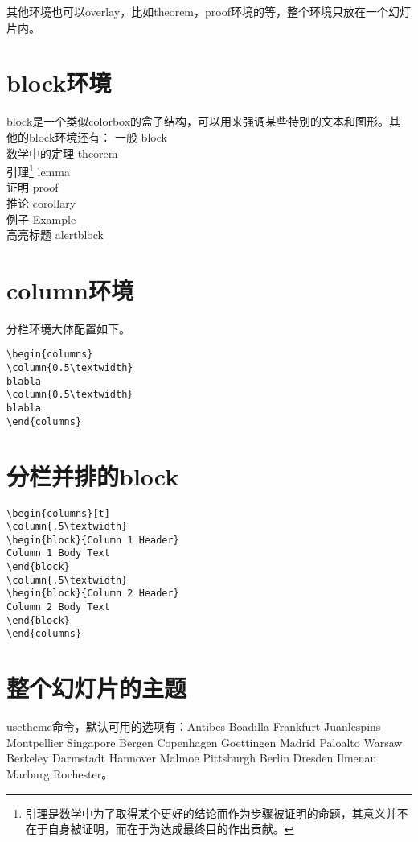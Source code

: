 \documentclass[11pt,oneside]{book}
\begin{document}
\begin{common-format}
其他环境也可以overlay，比如theorem，proof环境的等，整个环境只放在一个幻灯片内。

\section{block环境}
block是一个类似colorbox的盒子结构，可以用来强调某些特别的文本和图形。其他的block环境还有：
一般  block\\
数学中的定理  theorem\\
引理\footnote{引理是数学中为了取得某个更好的结论而作为步骤被证明的命题，其意义并不在于自身被证明，而在于为达成最终目的作出贡献。}   lemma\\
证明  proof\\
推论 corollary\\
例子 Example\\
高亮标题 alertblock


\section{column环境}
分栏环境大体配置如下。
\begin{Verbatim}
\begin{columns}
\column{0.5\textwidth}
blabla
\column{0.5\textwidth}
blabla
\end{columns}
\end{Verbatim}

\section{分栏并排的block}
\begin{Verbatim}
\begin{columns}[t]
\column{.5\textwidth}
\begin{block}{Column 1 Header}
Column 1 Body Text
\end{block}
\column{.5\textwidth}
\begin{block}{Column 2 Header}
Column 2 Body Text
\end{block}
\end{columns}
\end{Verbatim}

\section{整个幻灯片的主题}
usetheme命令，默认可用的选项有：Antibes Boadilla Frankfurt Juanlespins Montpellier Singapore
Bergen Copenhagen Goettingen Madrid Paloalto Warsaw Berkeley Darmstadt Hannover Malmoe Pittsburgh Berlin Dresden Ilmenau Marburg Rochester。


\end{common-format}
\end{document}
